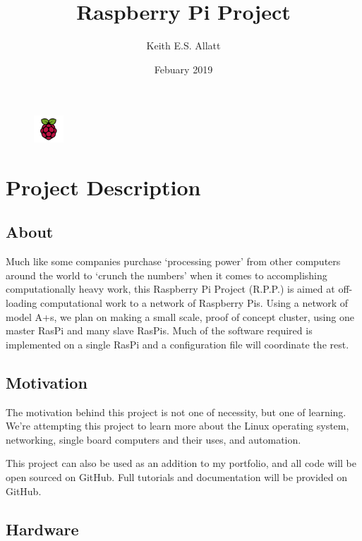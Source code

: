 \documentclass{report}
\title{Raspberry Pi Project}
\author{Keith E.S. Allatt}
\date{Febuary 2019}
\begin{document}
{\let\newpage\relax\maketitle}
\begin{figure}[ht!]
	\centering
	\includegraphics[width=0.1\textwidth]{raspi.png}
\end{figure}
\chapter{Project Description}

\section{About}

Much like some companies purchase `processing power' from other computers around the world to `crunch the numbers' when it comes to accomplishing computationally heavy work, this Raspberry Pi Project (R.P.P.) is aimed at off-loading computational work to a network of Raspberry Pis. Using a network of model A+s,  we plan on making a small scale, proof of concept cluster, using one master RasPi and many slave RasPis. Much of the software required is implemented on a single RasPi and a configuration file will coordinate the rest.

\section{Motivation}

The motivation behind this project is not one of necessity, but one of learning. We're attempting this project to learn more about the Linux operating system, networking, single board computers and their uses, and automation.

This project can also be used as an addition to my portfolio, and all code will be open sourced on GitHub. Full tutorials and documentation will be provided on GitHub. 

\section{Hardware}
\end{document}
